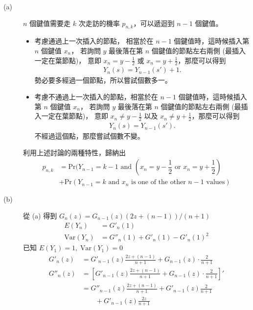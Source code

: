 \documentclass[11pt,fleqn]{article}
\begin{document}
\begin{description}
	\item[(a)] $n$ 個鍵值需要走 $k$ 次走訪的機率 $p_{n,k}$，可以遞迴到 $n-1$ 個鍵值。
		\begin{itemize}
			\item 考慮通過上一次插入的節點，
				相當於在 $n-1$ 個鍵值時，這時候插入第 $n$ 個鍵值 $x_n$，
				若詢問 $y$ 最後落在第 $n$ 個鍵值的節點左右兩側 (最插入一定在葉節點)，
				意即 $x_n = y - \frac{1}{2}$ 或 $x_n = y + \frac{1}{2}$，那麼可以得到 
				\begin{align*}
					Y_n(s) = Y_{n-1}(s') + 1.
				\end{align*}
				勢必要多經過一個節點，所以嘗試個數多一。
			\item 考慮不通過上一次插入的節點，相當於在 $n-1$ 個鍵值時，這時候插入第 $n$ 個鍵值 $x_n$，
				若詢問 $y$ 最後落在第 $n$ 個鍵值的節點左右兩側 (最插入一定在葉節點)，
				意即 $x_n \neq y - \frac{1}{2}$ 以及 $x_n \neq y + \frac{1}{2}$，那麼可以得到 
				\begin{align*}
					Y_n(s) = Y_{n-1}(s').
				\end{align*}
				不經過這個點，那麼嘗試個數不變。
		\end{itemize}
		利用上述討論的兩種特性，歸納出
		\begin{align*}
			p_{n,k} &= \text{Pr}(Y_{n-1} = k-1 \text{ and } (x_n = y - \dfrac{1}{2} \text{ or } x_n = y + \dfrac{1}{2}) \\
					& + \text{Pr}(Y_{n-1} = k \text{ and } x_n \text{ is one of the other } n-1 \text{ values}) 
		\end{align*}
	\item[(b)] 從 (a) 得到 $G_n(z) = G_{n-1}(z) (2 z + (n-1)) / (n+1)$
		\begin{align*}
			E(Y_n) &= {G}'_n(1) \\
			\text{Var}(Y_n) &= {G}''_n(1) + {G}'_n(1) - {G}'_n(1)^2
		\end{align*}
		已知 $E(Y_1) = 1, \; \text{Var}(Y_1) = 0$
		\begin{align*}
			{G}'_n(z) &= {G}'_{n-1}(z) \frac{2z + (n-1)}{n+1} + G_{n-1}(z) \cdot \frac{2}{n+1} \\
			{G}''_n(z) &= \left[ {G}'_{n-1}(z) \frac{2z + (n-1)}{n+1} + G_{n-1}(z) \cdot \frac{2}{n+1} \right]' \\
				&= {G}''_{n-1}(z)\frac{2z + (n-1)}{n+1} + {G}'_{n-1}(z) \frac{2}{n+1} \\
				& \qquad + {G}'_{n-1}(z)\frac{2z}{n+1}\\
		\end{align*}

\end{description}
\end{document}

